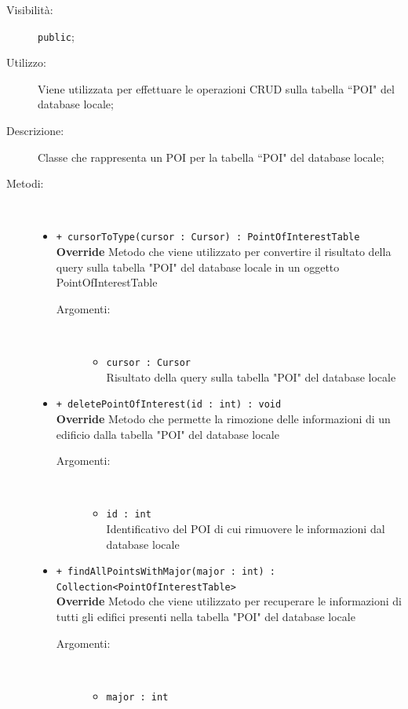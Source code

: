 \documentclass[../DefinizioneDiProdotto.tex]{subfiles}
\begin{document}
\begin{description}
\begin{itemize}
\end{itemize}
\item[Visibilità:] \texttt{public};
\item[Utilizzo:] Viene utilizzata per effettuare le operazioni CRUD sulla tabella “POI" del database locale;
\item[Descrizione:] Classe che rappresenta un POI per la tabella “POI" del database locale;
\item[Metodi:] \
\begin{itemize}
\item \texttt{+ cursorToType(cursor : Cursor) : PointOfInterestTable}\\
\textbf{Override} Metodo che viene utilizzato per convertire il risultato della query sulla tabella "POI" del database locale in un oggetto PointOfInterestTable
 \begin{description}
\item[Argomenti:] \
\begin{itemize}
\item \texttt{cursor : Cursor}\\
Risultato della query sulla tabella "POI" del database locale\end{itemize}
\end{description}
\item \texttt{+ deletePointOfInterest(id : int) : void}\\
\textbf{Override} Metodo che permette la rimozione delle informazioni di un edificio dalla tabella "POI" del database locale 
 \begin{description}
\item[Argomenti:] \
\begin{itemize}
\item \texttt{id : int}\\
Identificativo del POI di cui rimuovere le informazioni dal database locale\end{itemize}
\end{description}
\item \texttt{+ findAllPointsWithMajor(major : int) :\\Collection<PointOfInterestTable>}\\
\textbf{Override} Metodo che viene utilizzato per recuperare le informazioni di tutti gli edifici presenti nella tabella "POI" del database locale
 \begin{description}
\item[Argomenti:] \
\begin{itemize}
\item \texttt{major : int}\\

\end{itemize}
\end{description}
\end{itemize}
\end{description}
\end{document}
